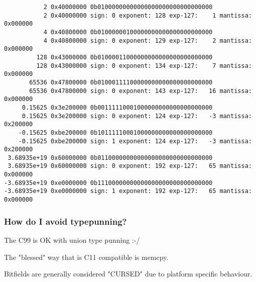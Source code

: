 \documentclass[11pt]{article}
\begin{document}
\begin{verbatim}
           2 0x40000000 0b01000000000000000000000000000000
           2 0x40000000 sign: 0 exponent: 128 exp-127:    1 mantissa: 0x000000
           4 0x40800000 0b01000000100000000000000000000000
           4 0x40800000 sign: 0 exponent: 129 exp-127:    2 mantissa: 0x000000
         128 0x43000000 0b01000011000000000000000000000000
         128 0x43000000 sign: 0 exponent: 134 exp-127:    7 mantissa: 0x000000
       65536 0x47800000 0b01000111100000000000000000000000
       65536 0x47800000 sign: 0 exponent: 143 exp-127:   16 mantissa: 0x000000
     0.15625 0x3e200000 0b00111110001000000000000000000000
     0.15625 0x3e200000 sign: 0 exponent: 124 exp-127:   -3 mantissa: 0x200000
    -0.15625 0xbe200000 0b10111110001000000000000000000000
    -0.15625 0xbe200000 sign: 1 exponent: 124 exp-127:   -3 mantissa: 0x200000
 3.68935e+19 0x60000000 0b01100000000000000000000000000000
 3.68935e+19 0x60000000 sign: 0 exponent: 192 exp-127:   65 mantissa: 0x000000
-3.68935e+19 0xe0000000 0b11100000000000000000000000000000
-3.68935e+19 0xe0000000 sign: 1 exponent: 192 exp-127:   65 mantissa: 0x000000
\end{verbatim}

\subsubsection{How do I avoid typepunning?}
\label{sec:org1dc4d9b}

The C99 is OK with union type punning :-/

The "blessed" way that is C11 compatible is memcpy.

Bitfields are generally considered "CURSED" due to platform specific
behaviour.
\end{document}
